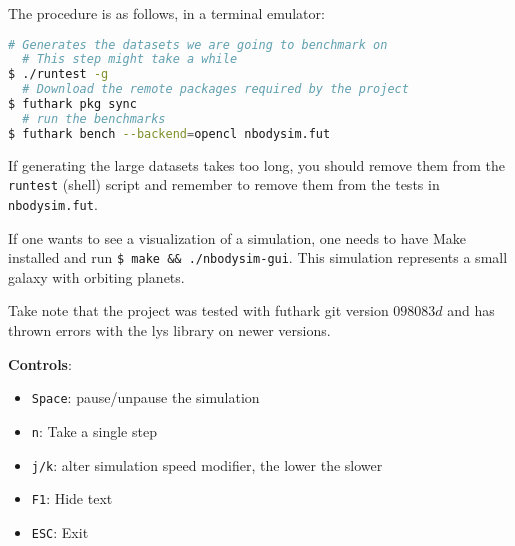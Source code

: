 The procedure is as follows, in a terminal emulator: \\
\begin{lstlisting}[language=bash]
  # Generates the datasets we are going to benchmark on
  # This step might take a while
$ ./runtest -g
  # Download the remote packages required by the project
$ futhark pkg sync
  # run the benchmarks
$ futhark bench --backend=opencl nbodysim.fut
\end{lstlisting}

If generating the large datasets takes too long, you should remove them from the
\texttt{runtest} (shell) script and remember to remove them from the tests in
\texttt{nbodysim.fut}.

If one wants to see a visualization of a simulation, one needs to have Make
installed and run \texttt{\$ make \&\& ./nbodysim-gui}. This simulation
represents a small galaxy with orbiting planets.

Take note that the project was tested with futhark git version $098083d$ and has
thrown errors with the lys library on newer versions.

\noindent
\textbf{Controls}:
\begin{itemize}
  \item \texttt{Space}: pause/unpause the simulation
  \item \texttt{n}: Take a single step
  \item \texttt{j/k}: alter simulation speed modifier, the lower the slower
  \item \texttt{F1}: Hide text
  \item \texttt{ESC}: Exit
\end{itemize}
